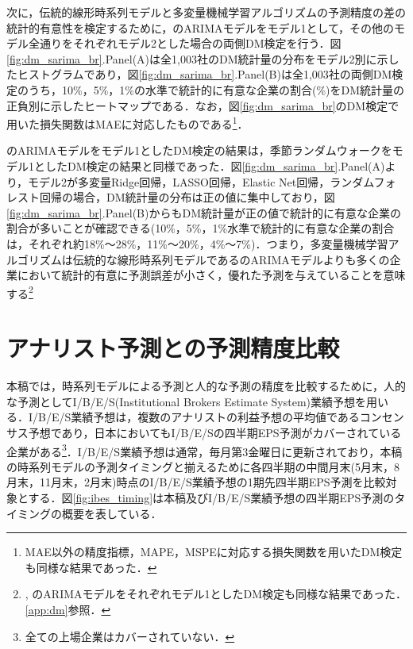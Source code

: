 \documentclass[a4paper，11pt]{jsarticle}
\begin{document}
次に，伝統的線形時系列モデルと多変量機械学習アルゴリズムの予測精度の差の統計的有意性を検定するために，\cite{brown1979univariate}のARIMAモデルをモデル1として，その他のモデル全通りをそれぞれモデル2とした場合の両側DM検定を行う．図\ref{fig:dm_sarima_br}.Panel(A)は全1,003社のDM統計量の分布をモデル2別に示したヒストグラムであり，図\ref{fig:dm_sarima_br}.Panel(B)は全1,003社の両側DM検定のうち，10\%，5\%，1\%の水準で統計的に有意な企業の割合(\%)をDM統計量の正負別に示したヒートマップである．なお，図\ref{fig:dm_sarima_br}のDM検定で用いた損失関数はMAEに対応したものである\footnote{MAE以外の精度指標，MAPE，MSPEに対応する損失関数を用いたDM検定も同様な結果であった．}．

\cite{brown1979univariate}のARIMAモデルをモデル1としたDM検定の結果は，季節ランダムウォークをモデル1としたDM検定の結果と同様であった．図\ref{fig:dm_sarima_br}.Panel(A)より，モデル2が多変量Ridge回帰，LASSO回帰，Elastic Net回帰，ランダムフォレスト回帰の場合，DM統計量の分布は正の値に集中しており，図\ref{fig:dm_sarima_br}.Panel(B)からもDM統計量が正の値で統計的に有意な企業の割合が多いことが確認できる(10\%，5\%，1\%水準で統計的に有意な企業の割合は，それぞれ約18\%～28\%，11\%～20\%，4\%～7\%)．つまり，多変量機械学習アルゴリズムは伝統的な線形時系列モデルである\cite{brown1979univariate}のARIMAモデルよりも多くの企業において統計的有意に予測誤差が小さく，優れた予測を与えていることを意味する\footnote{\cite{foster1977quarterly}, \cite{griffin1977time}のARIMAモデルをそれぞれモデル1としたDM検定も同様な結果であった．\ref{app:dm}参照．}

\section{アナリスト予測との予測精度比較} \label{sec:ibes}

本稿では，時系列モデルによる予測と人的な予測の精度を比較するために，人的な予測としてI/B/E/S(Institutional Brokers Estimate System)業績予想を用いる．I/B/E/S業績予想は，複数のアナリストの利益予想の平均値であるコンセンサス予想であり，日本においてもI/B/E/Sの四半期EPS予測がカバーされている企業がある\footnote{全ての上場企業はカバーされていない．}．I/B/E/S業績予想は通常，毎月第3金曜日に更新されており，本稿の時系列モデルの予測タイミングと揃えるために各四半期の中間月末(5月末，8月末，11月末，2月末)時点のI/B/E/S業績予想の1期先四半期EPS予測を比較対象とする．図\ref{fig:ibes_timing}は本稿及びI/B/E/S業績予想の四半期EPS予測のタイミングの概要を表している．
\end{document}
